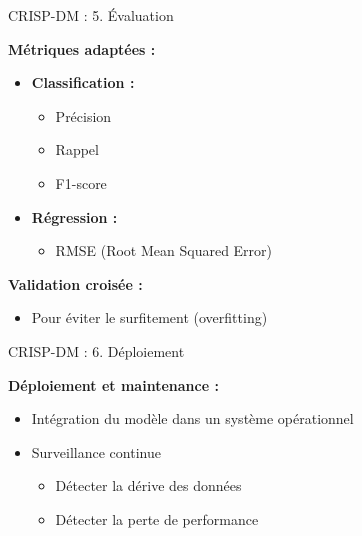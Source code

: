 \begin{frame}{CRISP-DM : 5. Évaluation}

\textbf{Métriques adaptées :}

\vspace{0.3cm}

\begin{itemize}
    \item<+-> \textbf{Classification :}
        \begin{itemize}
            \item Précision
            \item Rappel
            \item F1-score
        \end{itemize}

    \vspace{0.2cm}
    \item<+-> \textbf{Régression :}
        \begin{itemize}
            \item RMSE (Root Mean Squared Error)
        \end{itemize}
\end{itemize}

\vspace{0.3cm}

\textbf{Validation croisée :}
\begin{itemize}
    \item Pour éviter le surfitement (overfitting)
\end{itemize}

\end{frame}

\begin{frame}{CRISP-DM : 6. Déploiement}

\textbf{Déploiement et maintenance :}

\vspace{0.3cm}

\begin{itemize}
    \item<+-> Intégration du modèle dans un système opérationnel
    \item<+-> Surveillance continue
        \begin{itemize}
            \item Détecter la dérive des données
            \item Détecter la perte de performance
        \end{itemize}
\end{itemize}

\end{frame}

